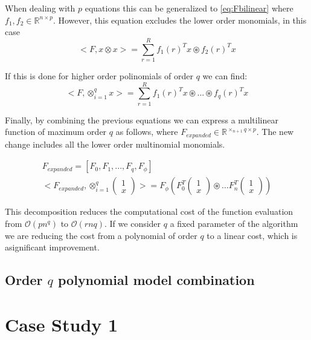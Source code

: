 \documentclass{article}
\begin{document}
When dealing with $p$ equations this can be generalized to \ref{eq:Fbilinear}
where $f_1, f_2 \in \mathbb{R}^{n \times p}$. However, this equation excludes
the lower order monomials, in this case
\begin{equation}\label{eq:Fbilinear}
    <F, x \otimes x> = \sum_{r=1}^R f_1(r)^T x \circledast f_2(r)^T x 
\end{equation}

If this is done for higher order polinomials of order $q$ we can find:
\begin{equation}
    <F, \otimes_{i = 1}^{q} x > = \sum_{r=1}^R f_1(r)^T x \circledast ... \circledast f_q(r)^T x 
\end{equation}

Finally, by combining the previous equations we 
can express a multilinear function of maximum order $q$ as follows,
where $F_{expanded} \in \mathbb{R}^{\times_{n+1}q \times p}$. The new change
includes all the lower order multinomial monomials. 

\begin{align}
    F_{expanded} = [F_0, F_1, ..., F_q, F_\phi]\\
    <F_{expanded}, \otimes_{i = 1}^{q}
    \begin{pmatrix}
        1 \\
        x
    \end{pmatrix}
    > = F_\phi( F_0^T \begin{pmatrix}
        1 \\
        x
    \end{pmatrix} \circledast \dots
    F_n^T \begin{pmatrix}
        1 \\
        x
    \end{pmatrix})
\end{align}

This decomposition reduces the computational cost of the 
function evaluation from $\mathcal{O}(pn^q)$ 
to $\mathcal{O}(rnq)$. If we consider $q$ a fixed parameter
of the algorithm we are reducing the cost from a polynomial
of order $q$ to a linear cost, which is asignificant improvement.

\subsection{Order $q$ polynomial model combination}

\section{Case Study 1}
\end{document}
